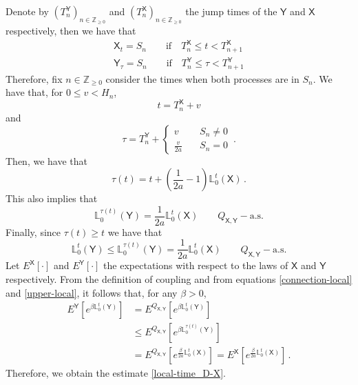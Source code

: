 \documentclass[a4paper,11pt,oneside,reqno]{amsart}
\theoremstyle{definition}
\renewcommand{\leq}{\leqslant}
\renewcommand{\geq}{\geqslant}
\numberwithin{equation}{section}
\begin{document}
{Denote by $(T_{n}^{\mathsf{Y}})_{n\in\mathbb{Z}_{\geq 0}}$ and $(T_{n}^{\mathsf{X}})_{n\in\mathbb{Z}_{\geq 0}}$ the jump times of the $\mathsf{Y}$ and $\mathsf{X}$ respectively, then we have that 
\begin{equation*}
	\begin{split}
		\mathsf{X}_{t}= S_{n}\qquad \text{if}\quad T_{n}^{\mathsf{X}}\leq t< T_{n+1}^{\mathsf{X}}\\
		\mathsf{Y}_{\tau}= S_{n}\qquad \text{if}\quad T_{n}^{\mathsf{Y}}\leq \tau< T_{n+1}^{\mathsf{Y}}
	\end{split}
\end{equation*}
Therefore, fix $n\in \mathbb{Z}_{\geq 0}$ consider the times when both processes are in $S_{n}$. We have that, for $0\leq v< H_{n}$,
\begin{equation*}
	t= T_{n}^{\mathsf{X}}+v
\end{equation*}
and 
\begin{equation*}
	\tau= T_{n}^{\mathsf{Y}}+
	\begin{cases}
		v\quad &S_{n}\neq 0\\
		\frac{v}{2a}\quad& S_{n}=0
	\end{cases}\,.
\end{equation*}
Then, we have that 
\begin{equation*}
	\tau(t)=t+\left(\frac{1}{2a}-1\right)\mathbb{L}_{0}^{t}(\mathsf{X})\,.
\end{equation*}
This also implies that 
\begin{equation}\label{connection-local}
	\mathbb{L}_{0}^{\tau(t)}(\mathsf{Y})=\frac{1}{2a}\mathbb{L}_{0}^{t}(\mathsf{X})
	\qquad Q_{\mathsf{X},\mathsf{Y}}-\text{a.s.}
\end{equation}
Finally, since $\tau(t)\geq t$ we have that 
\begin{equation}\label{upper-local}
	\mathbb{L}_{0}^{t}(\mathsf{Y})\leq \mathbb{L}_{0}^{\tau(t)}(\mathsf{Y})
	= \frac{1}{2a}\mathbb{L}_{0}^{t}(\mathsf{X})
	\qquad Q_{\mathsf{X},\mathsf{Y}}-\text{a.s.}
\end{equation}
Let $E^{\mathsf{X}}[\cdot]$ and $E^{\mathsf{Y}}[\cdot]$ the expectations with respect to the laws of $\mathsf{X}$ and $\mathsf{Y}$ respectively. From the definition of coupling and from equations \eqref{connection-local} and \eqref{upper-local}, it follows that, for any $\beta >0$, 
\begin{equation*}
	\begin{aligned}
		E^{\mathsf{Y}}[e^{\beta \mathbb{L}_{0}^{t}(\mathsf{Y})}]
		&= E^{Q_{\mathsf{X},\mathsf{Y}}}[e^{\beta \mathbb{L}_{0}^{t}(\mathsf{Y})}]\\
		&\leq E^{Q_{\mathsf{X},\mathsf{Y}}}[e^{\beta \mathbb{L}_{0}^{\tau(t)}(\mathsf{Y})}]\\
		&= E^{Q_{\mathsf{X},\mathsf{Y}}}[e^{\frac{\beta}{2a}\mathbb{L}_{0}^{t}(\mathsf{X})}]
		= E^{\mathsf{X}}[e^{\frac{\beta}{2a}\mathbb{L}_{0}^{t}(\mathsf{X})}]\,.
	\end{aligned}
\end{equation*}
Therefore, we obtain the estimate \eqref{local-time_D-X}. 

}
\end{document}
